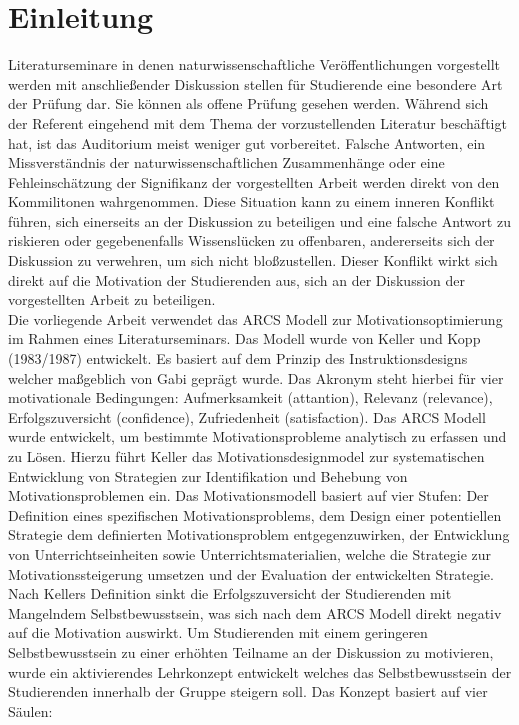 \section{Einleitung}
Literaturseminare in denen naturwissenschaftliche Veröffentlichungen vorgestellt werden mit anschließender Diskussion stellen für Studierende eine besondere Art der Prüfung dar. Sie können als offene Prüfung gesehen werden. Während sich der Referent eingehend mit dem Thema der vorzustellenden Literatur beschäftigt hat, ist das Auditorium meist weniger gut vorbereitet. Falsche Antworten, ein Missverständnis der naturwissenschaftlichen Zusammenhänge oder eine
Fehleinschätzung der Signifikanz der vorgestellten Arbeit werden direkt von den Kommilitonen wahrgenommen. Diese Situation kann zu einem inneren Konflikt führen, sich einerseits an der Diskussion zu beteiligen und eine falsche Antwort zu riskieren oder gegebenenfalls Wissenslücken zu offenbaren, andererseits sich der Diskussion zu verwehren, um sich nicht bloßzustellen. Dieser Konflikt wirkt sich direkt auf die Motivation der Studierenden aus, sich an der Diskussion der vorgestellten Arbeit zu beteiligen.\\
\noindent
Die vorliegende Arbeit verwendet das ARCS Modell zur Motivationsoptimierung im Rahmen eines Literaturseminars. Das Modell wurde von Keller und Kopp (1983/1987) entwickelt. Es basiert auf dem Prinzip des Instruktionsdesigns welcher maßgeblich von Gabi geprägt wurde. Das Akronym steht hierbei für vier motivationale Bedingungen: Aufmerksamkeit (attantion), Relevanz (relevance), Erfolgszuversicht (confidence), Zufriedenheit (satisfaction). Das ARCS Modell wurde entwickelt, um bestimmte Motivationsprobleme analytisch zu erfassen und zu Lösen. Hierzu führt Keller das Motivationsdesignmodel zur systematischen Entwicklung von Strategien zur Identifikation und Behebung von Motivationsproblemen ein. Das Motivationsmodell basiert auf vier Stufen: Der Definition eines spezifischen Motivationsproblems, dem Design einer potentiellen Strategie dem definierten Motivationsproblem entgegenzuwirken, der Entwicklung von Unterrichtseinheiten sowie Unterrichtsmaterialien, welche die Strategie zur Motivationssteigerung umsetzen und der Evaluation der entwickelten Strategie.\\
\noindent
Nach Kellers Definition sinkt die Erfolgszuversicht der Studierenden mit Mangelndem Selbstbewusstsein, was sich nach dem ARCS Modell direkt negativ auf die Motivation auswirkt. Um Studierenden mit einem geringeren Selbstbewusstsein zu einer erhöhten Teilname an der Diskussion zu motivieren, wurde ein aktivierendes Lehrkonzept entwickelt welches das Selbstbewusstsein der Studierenden innerhalb der Gruppe steigern soll. Das Konzept basiert auf vier Säulen:
